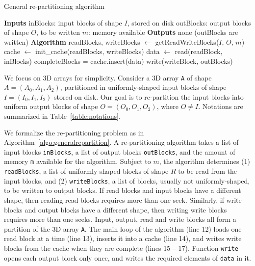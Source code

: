 \documentclass[sigconf, nonacm]{acmart}
\begin{document}
\begin{algorithm}[b]
  \caption{General re-partitioning algorithm}
  \label{algo:generalrepartition}
  \begin{algorithmic}[1]
    \STATE \textbf{Inputs}
    \STATE inBlocks: input blocks of shape $I$, stored on disk
    \STATE outBlocks: output blocks of shape $O$, to be written
    \STATE $m$: memory available
    \STATE
    \STATE \textbf{Outputs}
    \STATE none (outBlocks are written)
    \STATE
    \STATE \textbf{Algorithm}
    \STATE readBlocks, writeBlocks $\leftarrow$ getReadWriteBlocks($I$, $O$, $m$)
    \STATE cache $\leftarrow$ init\_cache(readBlocks, writeBlocks)
      \STATE data $\leftarrow$ read(readBlock, inBlocks)
      \STATE completeBlocks = cache.insert(data)
          \STATE write(writeBlock, outBlocks)
      \ENDFOR
    \ENDFOR

  \end{algorithmic}
\end{algorithm}

We focus on 3D arrays for simplicity. Consider a 3D array \texttt{A} of shape $A =
(A_0, A_1, A_2)$, partitioned in uniformly-shaped input blocks of shape $I =
(I_0, I_1, I_2)$ stored on disk. Our goal is to re-partition the input
blocks into uniform output blocks of shape $O = (O_0, O_1, O_2)$,
where $O \neq I$. Notations are summarized in
Table~\ref{table:notations}.

We formalize the re-partitioning problem as in Algorithm~\ref{algo:generalrepartition}.
A re-partitioning algorithm takes a
list of input blocks \texttt{inBlocks}, a list of output
blocks \texttt{outBlocks}, and the amount of memory \texttt{m}
available for the algorithm. Subject to $m$, the algorithm determines (1)
\texttt{readBlocks}, a list of uniformly-shaped blocks of shape $R$ to be read from the
input blocks, and (2) \texttt{writeBlocks}, a list of blocks,
usually not uniformly-shaped, to be written to output blocks.
If read blocks and input blocks have a different shape, then reading read blocks requires
more than one seek. Similarly, if write blocks and output blocks have a different shape,
then writing write blocks requires more than one seeks. Input, output, read
and write blocks all form a partition of the 3D array \texttt{A}. The
main loop of the algorithm (line 12) loads one read block at a time (line
13), inserts it into a cache (line 14), and writes write blocks from the
cache when they are complete (lines 15 -- 17). Function \texttt{write} opens
each output block only once, and writes the required elements of \texttt{data} in it.
\end{document}
